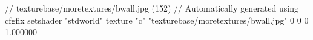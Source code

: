 // texturebase/moretextures/bwall.jpg (152)
// Automatically generated using cfgfix
setshader "stdworld"
texture "c" "texturebase/moretextures/bwall.jpg" 0 0 0 1.000000
